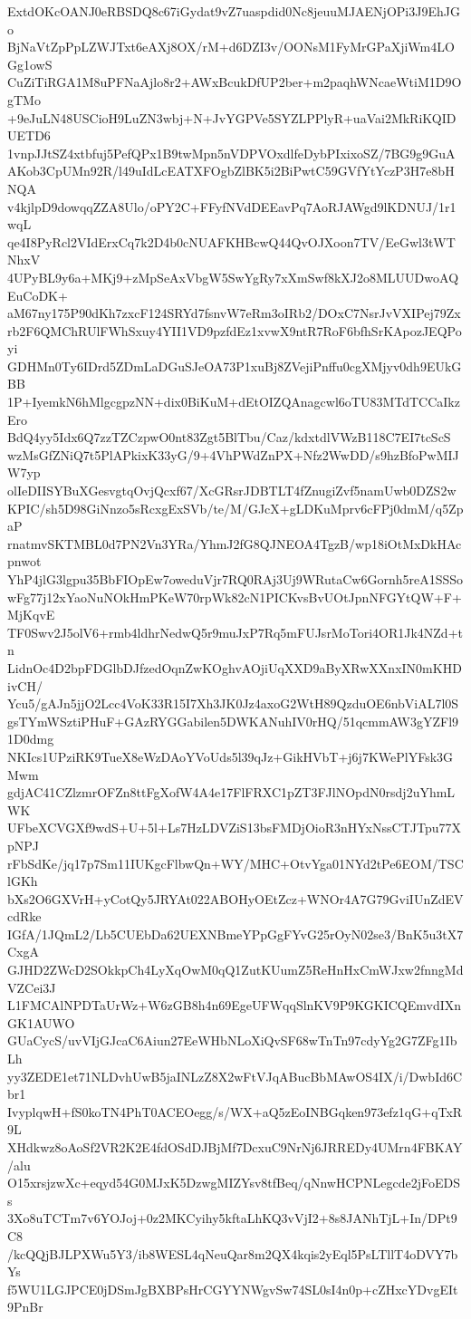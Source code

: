 ExtdOKcOANJ0eRBSDQ8c67iGydat9vZ7uaspdid0Nc8jeuuMJAENjOPi3J9EhJGo
BjNaVtZpPpLZWJTxt6eAXj8OX/rM+d6DZI3v/OONsM1FyMrGPaXjiWm4LOGg1owS
CuZiTiRGA1M8uPFNaAjlo8r2+AWxBcukDfUP2ber+m2paqhWNcaeWtiM1D9OgTMo
+9eJuLN48USCioH9LuZN3wbj+N+JvYGPVe5SYZLPPlyR+uaVai2MkRiKQIDUETD6
1vnpJJtSZ4xtbfuj5PefQPx1B9twMpn5nVDPVOxdlfeDybPIxixoSZ/7BG9g9GuA
AKob3CpUMn92R/l49uIdLcEATXFOgbZlBK5i2BiPwtC59GVfYtYczP3H7e8bHNQA
v4kjlpD9dowqqZZA8Ulo/oPY2C+FFyfNVdDEEavPq7AoRJAWgd9lKDNUJ/1r1wqL
qe4I8PyRcl2VIdErxCq7k2D4b0cNUAFKHBcwQ44QvOJXoon7TV/EeGwl3tWTNhxV
4UPyBL9y6a+MKj9+zMpSeAxVbgW5SwYgRy7xXmSwf8kXJ2o8MLUUDwoAQEuCoDK+
aM67ny175P90dKh7zxcF124SRYd7fsnvW7eRm3oIRb2/DOxC7NsrJvVXIPej79Zx
rb2F6QMChRUlFWhSxuy4YII1VD9pzfdEz1xvwX9ntR7RoF6bfhSrKApozJEQPoyi
GDHMn0Ty6IDrd5ZDmLaDGuSJeOA73P1xuBj8ZVejiPnffu0cgXMjyv0dh9EUkGBB
1P+IyemkN6hMlgcgpzNN+dix0BiKuM+dEtOIZQAnagcwl6oTU83MTdTCCaIkzEro
BdQ4yy5Idx6Q7zzTZCzpwO0nt83Zgt5BlTbu/Caz/kdxtdlVWzB118C7EI7tcScS
wzMsGfZNiQ7t5PlAPkixK33yG/9+4VhPWdZnPX+Nfz2WwDD/s9hzBfoPwMIJW7yp
olIeDIISYBuXGesvgtqOvjQcxf67/XcGRsrJDBTLT4fZnugiZvf5namUwb0DZS2w
KPIC/sh5D98GiNnzo5sRcxgExSVb/te/M/GJcX+gLDKuMprv6cFPj0dmM/q5ZpaP
rnatmvSKTMBL0d7PN2Vn3YRa/YhmJ2fG8QJNEOA4TgzB/wp18iOtMxDkHAcpnwot
YhP4jlG3lgpu35BbFIOpEw7oweduVjr7RQ0RAj3Uj9WRutaCw6Gornh5reA1SSSo
wFg77j12xYaoNuNOkHmPKeW70rpWk82cN1PICKvsBvUOtJpnNFGYtQW+F+MjKqvE
TF0Swv2J5olV6+rmb4ldhrNedwQ5r9muJxP7Rq5mFUJsrMoTori4OR1Jk4NZd+tn
LidnOc4D2bpFDGlbDJfzedOqnZwKOghvAOjiUqXXD9aByXRwXXnxIN0mKHDivCH/
Ycu5/gAJn5jjO2Lcc4VoK33R15I7Xh3JK0Jz4axoG2WtH89QzduOE6nbViAL7l0S
gsTYmWSztiPHuF+GAzRYGGabilen5DWKANuhIV0rHQ/51qcmmAW3gYZFl91D0dmg
NKIcs1UPziRK9TueX8eWzDAoYVoUds5l39qJz+GikHVbT+j6j7KWePlYFsk3GMwm
gdjAC41CZlzmrOFZn8ttFgXofW4A4e17FlFRXC1pZT3FJlNOpdN0rsdj2uYhmLWK
UFbeXCVGXf9wdS+U+5l+Ls7HzLDVZiS13bsFMDjOioR3nHYxNssCTJTpu77XpNPJ
rFbSdKe/jq17p7Sm11IUKgcFlbwQn+WY/MHC+OtvYga01NYd2tPe6EOM/TSClGKh
bXs2O6GXVrH+yCotQy5JRYAt022ABOHyOEtZcz+WNOr4A7G79GviIUnZdEVcdRke
IGfA/1JQmL2/Lb5CUEbDa62UEXNBmeYPpGgFYvG25rOyN02se3/BnK5u3tX7CxgA
GJHD2ZWcD2SOkkpCh4LyXqOwM0qQ1ZutKUumZ5ReHnHxCmWJxw2fnngMdVZCei3J
L1FMCAlNPDTaUrWz+W6zGB8h4n69EgeUFWqqSlnKV9P9KGKICQEmvdIXnGK1AUWO
GUaCycS/uvVIjGJcaC6Aiun27EeWHbNLoXiQvSF68wTnTn97cdyYg2G7ZFg1IbLh
yy3ZEDE1et71NLDvhUwB5jaINLzZ8X2wFtVJqABucBbMAwOS4IX/i/DwbId6Cbr1
IvyplqwH+fS0koTN4PhT0ACEOegg/s/WX+aQ5zEoINBGqken973efz1qG+qTxR9L
XHdkwz8oAoSf2VR2K2E4fdOSdDJBjMf7DcxuC9NrNj6JRREDy4UMrn4FBKAY/alu
O15xrsjzwXc+eqyd54G0MJxK5DzwgMIZYsv8tfBeq/qNnwHCPNLegcde2jFoEDSs
3Xo8uTCTm7v6YOJoj+0z2MKCyihy5kftaLhKQ3vVjI2+8s8JANhTjL+In/DPt9C8
/kcQQjBJLPXWu5Y3/ib8WESL4qNeuQar8m2QX4kqis2yEql5PsLTllT4oDVY7bYs
f5WU1LGJPCE0jDSmJgBXBPsHrCGYYNWgvSw74SL0sI4n0p+cZHxcYDvgEIt9PnBr
